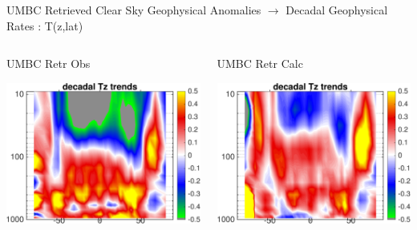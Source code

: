 \documentclass[10pt,t]{beamer}
\begin{document}
\begin{frame}{UMBC Retrieved Clear Sky Geophysical Anomalies $\rightarrow$ Decadal Geophysical Rates : T(z,lat)}
\begin{columns}
\begin{column}{0.45\columnwidth}
\begin{block}{\footnotesize UMBC Retr Obs}
\vspace{-0.1in}
\begin{center}
\includegraphics[width=0.95\linewidth]{Figs/ClearAnom/umbc_clr_retr_obs_wv_rate_200209_201808.png}
\end{center}
\end{block}
\end{column}

\begin{column}{0.45\columnwidth}
\begin{block}{\footnotesize UMBC Retr Calc}
\vspace{-0.1in}
\begin{center}
\includegraphics[width=0.95\linewidth]{Figs/ClearAnom/umbc_clr_retr_cal_wv_rate_200209_201808.png}
\end{center}
\end{block}
\end{column}
\end{columns}


\end{frame}
\end{document}
